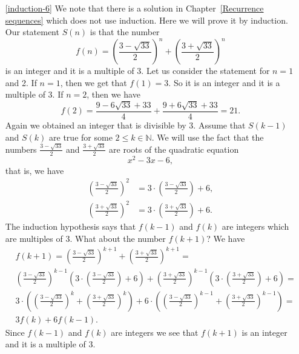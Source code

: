 \begin{enumerate}
\item[\ref{induction-6}] We note that there is a solution in Chapter~\ref{Recurrence sequences} which does not
use induction. Here we will prove it by induction. Our statement $S(n)$ is that the number 
$$
f(n)=\left(\frac{3-\sqrt{33}}{2}\right)^n+\left(\frac{3+\sqrt{33}}{2}\right)^n
$$
is an integer and it is a multiple of 3. Let us consider the statement for $n=1$ and 2.
If $n=1$, then we get that $f(1)=3$. So it is an integer and it is a multiple of 3. If $n=2$, then we have
$$
f(2)=\frac{9-6\sqrt{33}+33}{4}+\frac{9+6\sqrt{33}+33}{4}=21.
$$
Again we obtained an integer that is divisible by 3. Assume that $S(k-1)$ and $S(k)$ are true for some $2\leq k\in\mathbb{N}$.
We will use the fact that the numbers $\frac{3-\sqrt{33}}{2}$ and $\frac{3+\sqrt{33}}{2}$ are roots of the quadratic equation
$$
x^2-3x-6,
$$
that is, we have
\begin{align*}
\left(\frac{3-\sqrt{33}}{2}\right)^2&= 3 \cdot \left(\frac{3-\sqrt{33}}{2}\right)+6,\\
\left(\frac{3+\sqrt{33}}{2}\right)^2&= 3 \cdot \left(\frac{3+\sqrt{33}}{2}\right)+6.
\end{align*}
The induction hypothesis says that $f(k-1)$ and $f(k)$ are integers which are multiples of 3. What about the number $f(k+1)$?
We have
\begin{align*}
& f(k+1)=\left(\frac{3-\sqrt{33}}{2}\right)^{k+1}+\left(\frac{3+\sqrt{33}}{2}\right)^{k+1}=\\
& \left(\frac{3-\sqrt{33}}{2}\right)^{k-1}\left(3\cdot \left(\frac{3-\sqrt{33}}{2}\right)+6\right)
+\left(\frac{3+\sqrt{33}}{2}\right)^{k-1}\left(3\cdot \left(\frac{3+\sqrt{33}}{2}\right)+6\right)=\\
& 3\cdot \left(\left(\frac{3-\sqrt{33}}{2}\right)^{k}+\left(\frac{3+\sqrt{33}}{2}\right)^{k}\right)+6\cdot \left(\left(\frac{3-\sqrt{33}}{2}\right)^{k-1}+\left(\frac{3+\sqrt{33}}{2}\right)^{k-1}\right)=\\
& 3f(k)+6f(k-1).
\end{align*}
Since $f(k-1)$ and $f(k)$ are integers we see that $f(k+1)$ is an integer and it is a multiple of 3.


\end{enumerate}
